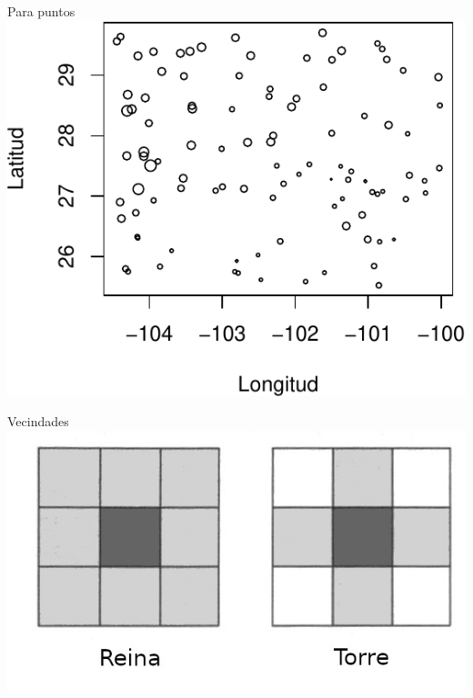 \documentclass[
  11pt,
  ignorenonframetext,
]{beamer}
\begin{document}
\begin{frame}{Para puntos}
\protect\hypertarget{para-puntos}{}
\includegraphics{Asociacion-espacio_files/figure-beamer/unnamed-chunk-5-1.pdf}
\end{frame}

\begin{frame}{Vecindades}
\protect\hypertarget{vecindades}{}
\includegraphics{Asociacion-imagenes/Reina-Torre.jpg}
\end{frame}
\end{document}

